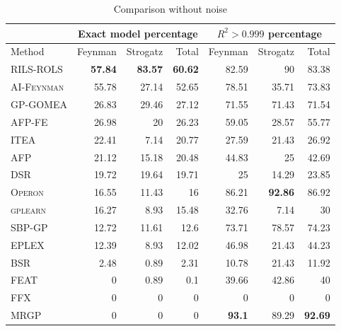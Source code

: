 \documentclass{bmcart}
\begin{document}
\begin{table}[!h]
	\caption{Comparison without noise}\label{tab:comp_noise0}
	\centering
	\begin{tabular}{l|rrr|rrr} \hline
		& \multicolumn{3}{c|}{Exact model percentage} & \multicolumn{3}{c}{$R^2 > 0.999$ percentage}\\ \hline
		Method & Feynman & Strogatz & Total & Feynman & Strogatz & Total \\ \hline
		\textsc{RILS-ROLS}&\bf{57.84}&\bf{83.57}&\bf{60.62}&82.59&90&83.38\\
		\textsc{AI-Feynman}&55.78&27.14&52.65&78.51&35.71&73.83\\
		\textsc{GP-GOMEA}&26.83&29.46&27.12&71.55&71.43&71.54\\
		\textsc{AFP-FE}&26.98&20&26.23&59.05&28.57&55.77\\
		\textsc{ITEA}&22.41&7.14&20.77&27.59&21.43&26.92\\
		\textsc{AFP}&21.12&15.18&20.48&44.83&25&42.69\\
		\textsc{DSR}&19.72&19.64&19.71&25&14.29&23.85\\
		\textsc{Operon}&16.55&11.43&16&86.21&\bf{92.86}&86.92\\
		\textsc{gplearn}&16.27&8.93&15.48&32.76&7.14&30\\
		\textsc{SBP-GP}&12.72&11.61&12.6&73.71&78.57&74.23\\
		\textsc{EPLEX}&12.39&8.93&12.02&46.98&21.43&44.23\\
		\textsc{BSR}&2.48&0.89&2.31&10.78&21.43&11.92\\
		\textsc{FEAT}&0&0.89&0.1&39.66&42.86&40\\
		\textsc{FFX}&0&0&0&0&0&0\\
		\textsc{MRGP}&0&0&0&\bf{93.1}&89.29&\bf{92.69}\\
		\hline
	\end{tabular}
\end{table}
\end{document}
